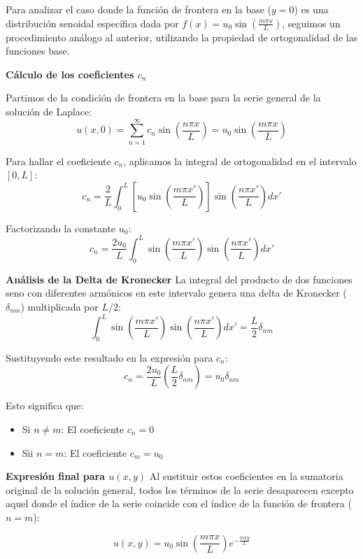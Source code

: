 \documentclass[a4paper]{article}
\begin{document}
Para analizar el caso donde la función de frontera en la base ($y=0$) es una distribución senoidal específica dada por $f(x) = u_0 \sin\left(\frac{m\pi x}{L}\right)$, seguimos un procedimiento análogo al anterior, utilizando la propiedad de ortogonalidad de las funciones base.

\textbf{Cálculo de los coeficientes $c_n$}

Partimos de la condición de frontera en la base para la serie general de la solución de Laplace:
$$u(x, 0) = \sum_{n=1}^{\infty} c_n \sin\left(\frac{n\pi x}{L}\right) = u_0 \sin\left(\frac{m\pi x}{L}\right)$$

Para hallar el coeficiente $c_n$, aplicamos la integral de ortogonalidad en el intervalo $[0, L]$:
$$c_n = \frac{2}{L} \int_0^L \left[ u_0 \sin\left(\frac{m\pi x'}{L}\right) \right] \sin\left(\frac{n\pi x'}{L}\right) dx'$$

Factorizando la constante $u_0$:
$$c_n = \frac{2u_0}{L} \int_0^L \sin\left(\frac{m\pi x'}{L}\right) \sin\left(\frac{n\pi x'}{L}\right) dx'$$

\textbf{Análisis de la Delta de Kronecker}
La integral del producto de dos funciones seno con diferentes armónicos en este intervalo genera una delta de Kronecker ($\delta_{nm}$) multiplicada por $L/2$:
$$\int_0^L \sin\left(\frac{m\pi x'}{L}\right) \sin\left(\frac{n\pi x'}{L}\right) dx' = \frac{L}{2} \delta_{nm}$$

Sustituyendo este resultado en la expresión para $c_n$:
$$c_n = \frac{2u_0}{L} \left( \frac{L}{2} \delta_{nm} \right) = u_0 \delta_{nm}$$

Esto significa que:
\begin{itemize}
	\item Si $n \neq m$: El coeficiente $c_n = 0$
	\item Sii $n = m$: El coeficiente $c_m = u_0$
\end{itemize}

\textbf{Expresión final para $u(x, y)$}
Al sustituir estos coeficientes en la sumatoria original de la solución general, todos los términos de la serie desaparecen excepto aquel donde el índice de la serie coincide con el índice de la función de frontera ($n = m$):

$$u(x, y) = u_0 \sin\left(\frac{m\pi x}{L}\right) e^{-\frac{m\pi y}{L}}$$
\end{document}
